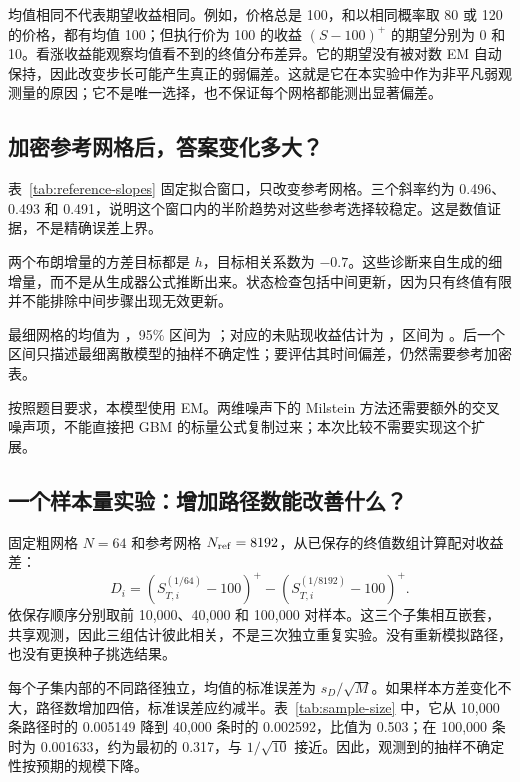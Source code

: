 \documentclass[11pt,a4paper,fontset=none]{ctexart}
\begin{document}
均值相同不代表期望收益相同。例如，价格总是 100，和以相同概率取 80 或 120 的价格，都有均值 100；但执行价为 100 的收益 $(S-100)^+$ 的期望分别为 0 和 10。看涨收益能观察均值看不到的终值分布差异。它的期望没有被对数 EM 自动保持，因此改变步长可能产生真正的弱偏差。这就是它在本实验中作为非平凡弱观测量的原因；它不是唯一选择，也不保证每个网格都能测出显著偏差。

\newpage
\subsection{加密参考网格后，答案变化多大？}

\NAReferenceInterpretation{}

表~\ref{tab:reference-slopes} 固定拟合窗口，只改变参考网格。三个斜率约为 0.496、0.493 和 0.491，说明这个窗口内的半阶趋势对这些参考选择较稳定。这是数值证据，不是精确误差上界。
\begin{table}[H]\centering
\caption{最细非仿射网格上的布朗增量与状态诊断。}

\end{table}
两个布朗增量的方差目标都是 $h$，目标相关系数为 $-0.7$。这些诊断来自生成的细增量，而不是从生成器公式推断出来。状态检查包括中间更新，因为只有终值有限并不能排除中间步骤出现无效更新。

最细网格的均值为 \NAExactMean{}，95\% 区间为 \NAExactMeanCI{}；对应的未贴现收益估计为 \NAPayoff{}，区间为 \NAPayoffCI{}。后一个区间只描述最细离散模型的抽样不确定性；要评估其时间偏差，仍然需要参考加密表。

按照题目要求，本模型使用 EM。两维噪声下的 Milstein 方法还需要额外的交叉噪声项，不能直接把 GBM 的标量公式复制过来；本次比较不需要实现这个扩展。

\newpage
\subsection{一个样本量实验：增加路径数能改善什么？}\label{sec:sample-size}
固定粗网格 $N=64$ 和参考网格 $N_{\rm ref}=8192$，从已保存的终值数组计算配对收益差：
\begin{equation}\label{eq:sample-size-difference}
D_i=(S_{T,i}^{(1/64)}-100)^+-(S_{T,i}^{(1/8192)}-100)^+.
\end{equation}
依保存顺序分别取前 10,000、40,000 和 100,000 对样本。这三个子集相互嵌套，共享观测，因此三组估计彼此相关，不是三次独立重复实验。没有重新模拟路径，也没有更换种子挑选结果。

每个子集内部的不同路径独立，均值的标准误差为 $s_D/\sqrt M$。如果样本方差变化不大，路径数增加四倍，标准误差应约减半。表~\ref{tab:sample-size} 中，它从 10,000 条路径时的 0.005149 降到 40,000 条时的 0.002592，比值为 0.503；在 100,000 条时为 0.001633，约为最初的 0.317，与 $1/\sqrt{10}$ 接近。因此，观测到的抽样不确定性按预期的规模下降。
\end{document}
